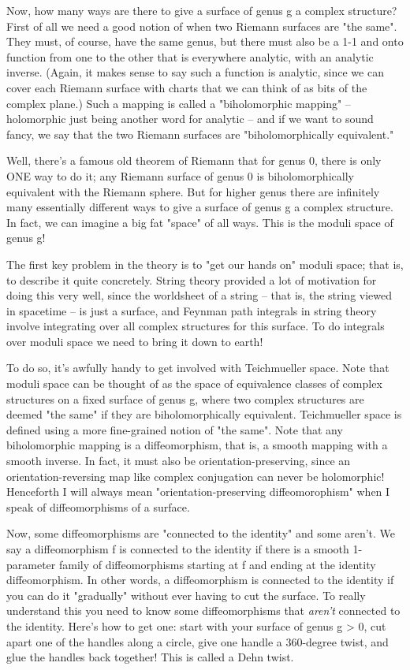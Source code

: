 Now, how many ways are there to give a surface of genus g a complex
structure?  First of all we need a good notion of when two Riemann
surfaces are "the same".  They must, of course, have the same genus, but
there must also be a 1-1 and onto function from one to the other that is
everywhere analytic, with an analytic inverse.  (Again, it makes sense to say
such a function is analytic, since we can cover each Riemann surface
with charts that we can think of as bits of the complex plane.)  Such a
mapping is called a "biholomorphic mapping" -- holomorphic just being
another word for analytic -- and if we want to sound fancy, we say that
the two Riemann surfaces are "biholomorphically equivalent."  

Well, there's a famous old theorem of Riemann that for genus 0, there is
only ONE way to do it; any Riemann surface of genus 0 is
biholomorphically equivalent with the Riemann sphere.  But for higher
genus there are infinitely many essentially different ways to give a
surface of genus g a complex structure.  In fact, we can imagine a
big fat "space" of all ways.  This is the moduli space of genus g!

The first key problem in the theory is to "get our hands on" moduli
space; that is, to describe it quite concretely.  String theory provided
a lot of motivation for doing this very well, since the worldsheet of a
string -- that is, the string viewed in spacetime -- is just a surface,
and Feynman path integrals in string theory involve integrating over all
complex structures for this surface.  To do integrals over moduli space
we need to bring it down to earth!  

To do so, it's awfully handy to get involved with Teichmueller space.
Note that moduli space can be thought of as the space of equivalence
classes of complex structures on a fixed surface of genus g, where two
complex structures are deemed "the same" if they are biholomorphically
equivalent.  Teichmueller space is defined using a more fine-grained
notion of "the same".  Note that any biholomorphic mapping is a
diffeomorphism, that is, a smooth mapping with a smooth inverse.  In
fact, it must also be orientation-preserving, since an
orientation-reversing map like complex conjugation can never be
holomorphic!  Henceforth I will always mean "orientation-preserving
diffeomorophism" when I speak of diffeomorphisms of a surface.

Now, some diffeomorphisms are "connected to the identity" and some
aren't.  We say a diffeomorphism f is connected to the identity if there
is a smooth 1-parameter family of diffeomorphisms starting at f and
ending at the identity diffeomorphism.  In other words, a diffeomorphism
is connected to the identity if you can do it "gradually" without ever
having to cut the surface.  To really understand this you need to
know some diffeomorphisms that \emph{aren't} connected to the identity.  Here's
how to get one: start with your surface of genus g > 0, cut apart one
of the handles along a circle, give one handle a 360-degree twist, and
glue the handles back together!  This is called a Dehn twist.


